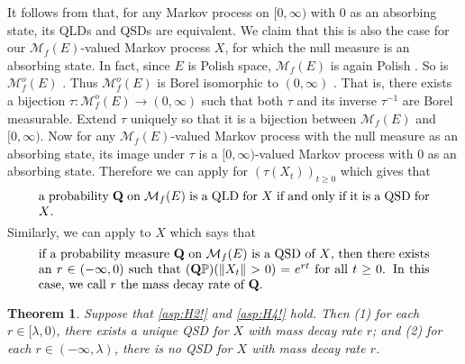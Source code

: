 \documentclass[12pt,a4paper]{amsart}
\numberwithin{equation}{section}
\theoremstyle{plain}
\newtheorem{thm}{Theorem}[section]
\theoremstyle{definition}
\theoremstyle{remark}
\begin{document}
	It follows from \cite[Proposition 1]{MeleardVillemonais2012Quasi-stationary} that, for any Markov process on $[0,\infty)$ with $0$ as an absorbing state, its QLDs and QSDs are equivalent.
	We claim that this is also the case for our $\mathcal M_f(E)$-valued Markov process
	$X$, for which the null measure is an absorbing state.
	In fact, since $E$ is Polish space, $\mathcal M_f(E)$ is again Polish \cite[Lemma 4.3]{Kallenberg2017Random}.
	So is $\mathcal M^o_f(E)$ \cite[Theorem A1.2]{Kallenberg2002Foundations}.
	Thus $\mathcal M^o_f(E)$ is Borel isomorphic to $(0,\infty)$ \cite[Theorem A.1.6]{Kallenberg2002Foundations}.
	That is, there exists a bijection $\tau: \mathcal M^o_f(E) \to (0,\infty)$ such that both $\tau$ and its inverse $\tau^{-1}$ are Borel measurable.
	Extend $\tau$ uniquely so that it is a bijection between $\mathcal M_f(E)$ and $[0,\infty)$.
	Now for any $\mathcal M_f(E)$-valued Markov process with the null measure as an absorbing state, its image under $\tau$ is a $[0,\infty)$-valued Markov process with $0$ as an absorbing state.
	Therefore we can apply \cite[Proposition 1]{MeleardVillemonais2012Quasi-stationary} for $(\tau(X_t))_{t\geq 0}$ which gives that
\begin{equation} \label{eq:S.1}
\begin{minipage}{0.9\textwidth}
	a probability $\mathbf Q$ on $\mathcal M_f(E)$ is a QLD for $X$ if and only if it is a QSD for $X$.
\end{minipage}
\end{equation}
	Similarly, we can apply \cite[Proposition 2]{MeleardVillemonais2012Quasi-stationary} to $X$ which says that
\begin{equation} \label{eq:S.2}
\begin{minipage}{0.9\textwidth}
	if a probability measure $\mathbf Q$ on $\mathcal M_f(E)$ is a QSD of $X$, then there exists an $r\in (-\infty,0)$ such that $(\mathbf Q\mathbb P)(\|X_t\|>0) = e^{rt}$ for all $t\geq 0$.
	In this case, we call $r$ the mass decay rate of $\mathbf Q$.
\end{minipage}
\end{equation}
	
\begin{thm} \label{thm:QSD}
	Suppose that \eqref{asp:H2!} and \eqref{asp:H4!} hold.
	Then (1) for each $r \in [\lambda, 0)$, there exists a unique QSD for $X$ with mass decay rate $r$;
	and (2) for each $r\in (-\infty, \lambda)$, there is no QSD for $X$ with mass decay rate $r$.
\end{thm}
\end{document}
